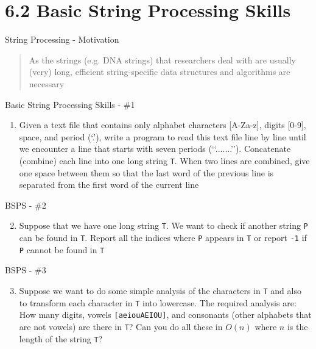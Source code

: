\documentclass{beamer}
\begin{document}
\section{6.2 Basic String Processing Skills}

\begin{frame}{String Processing - Motivation}
    \begin{quote}
        As the strings (e.g. DNA strings) that researchers deal with are usually (very) long, efficient string-specific data structures and algorithms are necessary
    \end{quote}
\end{frame}

\begin{frame}[fragile]{Basic String Processing Skills - \#1}
    \begin{enumerate}
        \item Given a text file that contains only alphabet characters [A-Za-z], digits [0-9], space, and period (‘.’), write a program to read this text file line by line until we encounter a line that starts with seven periods (‘‘.......’’). Concatenate (combine) each line into one long string \verb|T|. When two lines are combined, give one space between them so that the last word of the previous line is separated from the first word of the current line
    \end{enumerate}
\end{frame}

\begin{frame}[fragile]{BSPS - \#2}
    \begin{enumerate}
        \setcounter{enumi}{1}
        \item Suppose that we have one long string \verb|T|. We want to check if another string \verb|P| can be found in \verb|T|. Report all the indices where \verb|P| appears in \verb|T| or report \verb|-1| if \verb|P| cannot be found in \verb|T|
    \end{enumerate}
\end{frame}

\begin{frame}[fragile]{BSPS - \#3}
    \begin{enumerate}
        \setcounter{enumi}{2}
        \item Suppose we want to do some simple analysis of the characters in \verb|T| and also to transform each character in \verb|T| into lowercase. The required analysis are: How many digits, vowels \verb|[aeiouAEIOU]|, and consonants (other alphabets that are not vowels) are there in \verb|T|? Can you do all these in $O(n)$ where $n$ is the length of the string \verb|T|?
    \end{enumerate}
\end{frame}
\end{document}
